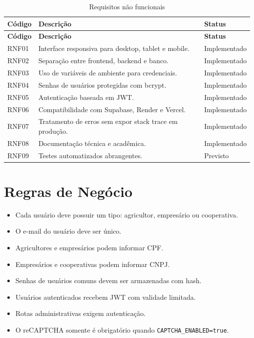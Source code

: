 \documentclass[
  12pt,
  oneside,
  a4paper,
  brazil
]{abntex2}
\begin{document}
\begin{longtable}{@{}p{}p{}p{}@{}}
\caption{Requisitos não funcionais}\\
\toprule
\textbf{Código} & \textbf{Descrição} & \textbf{Status} \\
\midrule
\endfirsthead
\toprule
\textbf{Código} & \textbf{Descrição} & \textbf{Status} \\
\midrule
\endhead
RNF01 & Interface responsiva para desktop, tablet e mobile. & Implementado \\
RNF02 & Separação entre frontend, backend e banco. & Implementado \\
RNF03 & Uso de variáveis de ambiente para credenciais. & Implementado \\
RNF04 & Senhas de usuários protegidas com bcrypt. & Implementado \\
RNF05 & Autenticação baseada em JWT. & Implementado \\
RNF06 & Compatibilidade com Supabase, Render e Vercel. & Implementado \\
RNF07 & Tratamento de erros sem expor stack trace em produção. & Implementado \\
RNF08 & Documentação técnica e acadêmica. & Implementado \\
RNF09 & Testes automatizados abrangentes. & Previsto \\
\bottomrule
\end{longtable}

\section{Regras de Negócio}

\begin{itemize}
  \item Cada usuário deve possuir um tipo: agricultor, empresário ou cooperativa.
  \item O e-mail do usuário deve ser único.
  \item Agricultores e empresários podem informar CPF.
  \item Empresários e cooperativas podem informar CNPJ.
  \item Senhas de usuários comuns devem ser armazenadas com hash.
  \item Usuários autenticados recebem JWT com validade limitada.
  \item Rotas administrativas exigem autenticação.
  \item O reCAPTCHA somente é obrigatório quando \texttt{CAPTCHA\_ENABLED=true}.
\end{itemize}
\end{document}
